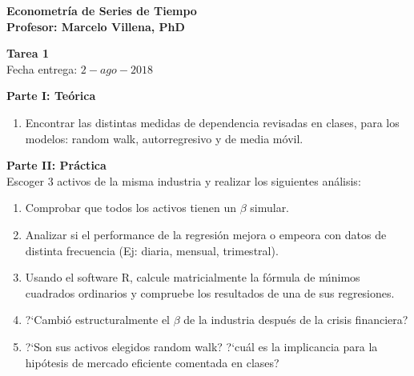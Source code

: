 \documentclass[12pt]{article}
\begin{document}
\textbf{Econometría de Series de Tiempo}\\
\textbf{Profesor: Marcelo Villena, PhD }\\ 

\begin{center}
\textbf{{\large Tarea 1}}\\
Fecha entrega: $2-ago-2018$ \\ 
\end{center}

\textbf{Parte I: Te\'orica}
\vspace{5mm}
\begin{enumerate}
\item Encontrar las distintas medidas de dependencia revisadas en clases, para los modelos: random walk, autorregresivo y de media m\'ovil.\\
\end{enumerate}

\textbf{Parte II: Pr\'actica} 
\vspace{5mm}\\
Escoger 3 activos de la misma industria y realizar los siguientes an\'alisis:
\begin{enumerate}
\item Comprobar que todos los activos tienen un $\beta$ simular.
\item Analizar si el performance de la regresi\'on mejora o empeora con datos de distinta frecuencia (Ej: diaria, mensual, trimestral).
\item Usando el software R, calcule matricialmente la f\'ormula de m\'\i{}nimos cuadrados ordinarios y compruebe los resultados de una de sus regresiones.
\item ?`Cambi\'o estructuralmente el $\beta$ de la industria despu\'es de la crisis financiera?
\item ?`Son sus activos elegidos random walk? ?`cu\'al es la implicancia para la hip\'otesis de mercado eficiente comentada en clases?

\end{enumerate}
\end{document}
